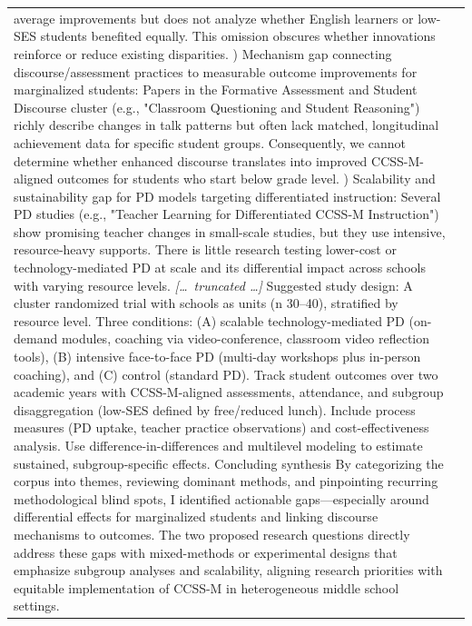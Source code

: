 \begin{longtable}{@{}l p{13cm}@{}}
average improvements but does not analyze whether English learners or low-SES students benefited equally. This omission obscures whether innovations reinforce or reduce existing disparities. \newline 2) Mechanism gap connecting discourse/assessment practices to measurable outcome improvements for marginalized students: Papers in the Formative Assessment and Student Discourse cluster (e.g., "Classroom Questioning and Student Reasoning") richly describe changes in talk patterns but often lack matched, longitudinal achievement data for specific student groups. Consequently, we cannot determine whether enhanced discourse translates into improved CCSS-M-aligned outcomes for students who start below grade level. \newline 3) Scalability and sustainability gap for PD models targeting differentiated instruction: Several PD studies (e.g., "Teacher Learning for Differentiated CCSS-M Instruction") show promising teacher changes in small-scale studies, but they use intensive, resource-heavy supports. There is little research testing lower-cost or technology-mediated PD at scale and its differential impact across schools with varying resource levels. \newline \textit{[\ldots\ truncated \ldots]} \newline Suggested study design: A cluster randomized trial with schools as units (n 30--40), stratified by resource level. Three conditions: (A) scalable technology-mediated PD (on-demand modules, coaching via video-conference, classroom video reflection tools), (B) intensive face-to-face PD (multi-day workshops plus in-person coaching), and (C) control (standard PD). Track student outcomes over two academic years with CCSS-M-aligned assessments, attendance, and subgroup disaggregation (low-SES defined by free/reduced lunch). Include process measures (PD uptake, teacher practice observations) and cost-effectiveness analysis. Use difference-in-differences and multilevel modeling to estimate sustained, subgroup-specific effects. \newline Concluding synthesis \newline By categorizing the corpus into themes, reviewing dominant methods, and pinpointing recurring methodological blind spots, I identified actionable gaps---especially around differential effects for marginalized students and linking discourse mechanisms to outcomes. The two proposed research questions directly address these gaps with mixed-methods or experimental designs that emphasize subgroup analyses and scalability, aligning research priorities with equitable implementation of CCSS-M in heterogeneous middle school settings.      \\

\end{longtable}
